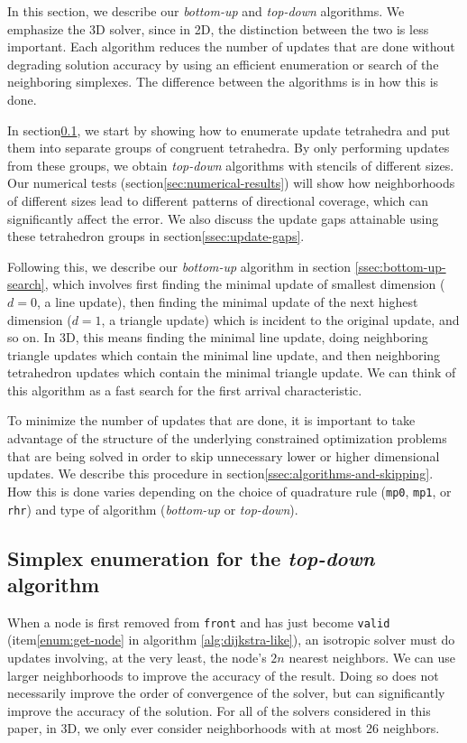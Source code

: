 \documentclass[smallcondensed]{svjour3}
\begin{document}
In this section, we describe our \emph{bottom-up} and \emph{top-down}
algorithms. We emphasize the 3D solver, since in 2D, the distinction
between the two is less important. Each algorithm reduces the number
of updates that are done without degrading solution accuracy by using
an efficient enumeration or search of the neighboring simplexes. The
difference between the algorithms is in how this is done.

In section\@ \ref{ssec:simplex-enumeration}, we start by showing how
to enumerate update tetrahedra and put them into separate groups of
congruent tetrahedra. By only performing updates from these groups, we
obtain \emph{top-down} algorithms with stencils of different sizes. Our
numerical tests (section\@ \ref{sec:numerical-results}) will show how
neighborhoods of different sizes lead to different patterns of
directional coverage, which can significantly affect the error. We
also discuss the update gaps attainable using these tetrahedron groups
in section\@ \ref{ssec:update-gaps}.

Following this, we describe our \emph{bottom-up} algorithm in section\@
\ref{ssec:bottom-up-search}, which involves first finding the minimal
update of smallest dimension ($d = 0$, a line update), then finding
the minimal update of the next highest dimension ($d = 1$, a triangle
update) which is incident to the original update, and so on. In 3D,
this means finding the minimal line update, doing neighboring triangle
updates which contain the minimal line update, and then neighboring
tetrahedron updates which contain the minimal triangle update. We can
think of this algorithm as a fast search for the first arrival
characteristic.

To minimize the number of updates that are done, it is important to
take advantage of the structure of the underlying constrained
optimization problems that are being solved in order to skip
unnecessary lower or higher dimensional updates. We describe this
procedure in section\@ \ref{ssec:algorithms-and-skipping}. How this
is done varies depending on the choice of quadrature rule
(\texttt{mp0}, \texttt{mp1}, or \texttt{rhr}) and type of algorithm
(\emph{bottom-up} or \emph{top-down}).

\subsection{Simplex enumeration for the \emph{top-down}
  algorithm}\label{ssec:simplex-enumeration}

When a node is first removed from \texttt{front} and has just become
\texttt{valid} (item\@ \ref{enum:get-node} in algorithm\@
\ref{alg:dijkstra-like}), an isotropic solver must do updates
involving, at the very least, the node's $2n$ nearest neighbors. We
can use larger neighborhoods to improve the accuracy of the
result. Doing so does not necessarily improve the order of convergence
of the solver, but can significantly improve the accuracy of the
solution. For all of the solvers considered in this paper, in 3D, we
only ever consider neighborhoods with at most 26 neighbors.
\end{document}
